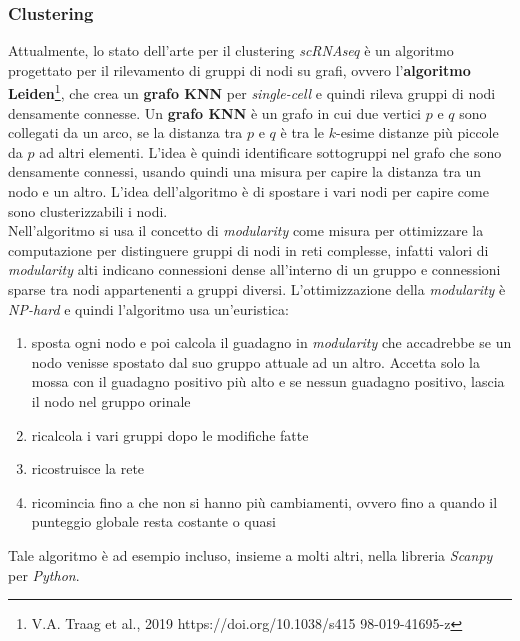 \documentclass[a4paper,12pt, oneside]{book}
\begin{document}
\subsubsection{Clustering}
Attualmente, lo stato dell'arte per il clustering \textit{scRNAseq} è
un algoritmo progettato per il rilevamento di gruppi di nodi su grafi, ovvero
l'\textbf{algoritmo Leiden}\footnote{V.A. Traag et al., 2019
https://doi.org/10.1038/s415 98-019-41695-z}, che crea un \textbf{grafo KNN} per
\textit{single-cell} e quindi rileva gruppi di nodi densamente connesse. Un
\textbf{grafo KNN} è un
grafo in cui due vertici $p$ e $q$ sono collegati da un arco, se la distanza tra
$p$ e $q$ è tra le $k$-esime distanze più piccole da $p$ ad altri
elementi. L'idea è quindi identificare sottogruppi nel grafo che sono
densamente connessi, usando quindi una misura per capire la distanza tra un nodo
e un altro. L'idea dell'algoritmo è di spostare i vari nodi per capire come sono
clusterizzabili i nodi.\\
Nell'algoritmo si usa il concetto di \textit{modularity} come misura per
ottimizzare la computazione per distinguere gruppi di nodi in reti complesse,
infatti valori di \textit{modularity} alti indicano connessioni dense
all'interno di un gruppo e connessioni sparse tra nodi appartenenti a gruppi
diversi. L'ottimizzazione della \textit{modularity} è \textit{NP-hard} e quindi
l'algoritmo usa un'euristica:
\begin{enumerate}
  \item sposta ogni nodo e poi calcola il guadagno in \textit{modularity} che
  accadrebbe se un nodo venisse spostato dal suo gruppo attuale ad un
  altro. Accetta solo la mossa con il guadagno positivo più alto e se nessun
  guadagno positivo, lascia il nodo nel gruppo orinale
  \item ricalcola i vari gruppi dopo le modifiche fatte
  \item ricostruisce la rete
  \item ricomincia fino a che non si hanno più cambiamenti, ovvero fino a
  quando il punteggio globale resta costante o quasi
\end{enumerate}
Tale algoritmo è ad esempio incluso, insieme a molti altri, nella libreria
\textit{Scanpy} per \textit{Python}.
\end{document}
